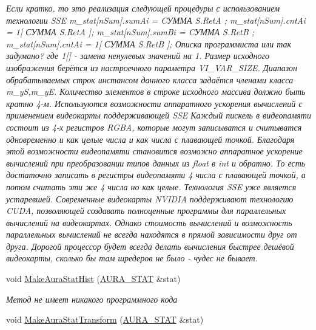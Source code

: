 \begin{DoxyCompactItemize}
\begin{DoxyCompactList}\small\item\em Если кратко, то это реализация следующей процедуры с использованием технологии S\+S\+E m\+\_\+stat\mbox{[}n\+Sum\mbox{]}.sum\+Ai = CУММА S.\+Ret\+A ; m\+\_\+stat\mbox{[}n\+Sum\mbox{]}.cnt\+Ai = 1\mbox{[} СУММА S.\+Ret\+A \mbox{]}; m\+\_\+stat\mbox{[}n\+Sum\mbox{]}.sum\+Bi = CУММА S.\+Ret\+B ; m\+\_\+stat\mbox{[}n\+Sum\mbox{]}.cnt\+Ai = 1\mbox{[} СУММА S.\+Ret\+B \mbox{]}; Описка программиста или так задумано? где 1\mbox{[}\mbox{]} -\/ замена ненулевых значений на 1. Размер исходного изображения берётся из настроечного параметра V\+I\+\_\+\+V\+A\+R\+\_\+\+S\+I\+Z\+E. Диапазон обрабатываемых строк инстансом данного класса задаётся членами класса m\+\_\+y\+S,m\+\_\+y\+E. Количество элементов в строке исходного массива должно быть кратно 4-\/м. Используются возможности аппаратного ускорения вычислений с применением видеокарты поддерживающей S\+S\+E Каждый пискель в видеопамяти состоит из 4-\/х регистров R\+G\+B\+A, которые могут записыватся и считыватся одновременно и как целые числа и как числа с плавающей точкой. Благодаря этой возможности видеопамяти становится возможно аппаратное ускорение вычислений при преобразовании типов данных из float в int и обратно. То есть достаточно записать в регистры видеопамяти 4 числа с плавающей точкой, а потом считать эти же 4 числа но как целые. Технология S\+S\+E уже является устаревшей. Современные видеокарты N\+V\+I\+D\+I\+A поддерживают технологию C\+U\+D\+A, позволяющей создавать полноценные программы для параллельных вычислений на видеокартах. Однако стоимость вычислений и возможность параллельных вычислений не всегда находятся в прямой зависимости друг от друга. Дорогой процессор будет всегда делать вычисления быстрее дешёвой видеокарты, сколько бы там шредеров не было -\/ чудес не бывает. \end{DoxyCompactList}\item 
void \hyperlink{class_c_v_i_engine_thread_ac5a7ba8ea2d72478af174b471d73fd5c}{Make\+Aura\+Stat\+Hist} (\hyperlink{class_a_u_r_a___s_t_a_t}{A\+U\+R\+A\+\_\+\+S\+T\+A\+T} \&stat)
\begin{DoxyCompactList}\small\item\em Метод не имеет никакого программного кода \end{DoxyCompactList}\item 
void \hyperlink{class_c_v_i_engine_thread_a83784b07cdfcd4f006fbfa41aacd4d86}{Make\+Aura\+Stat\+Transform} (\hyperlink{class_a_u_r_a___s_t_a_t}{A\+U\+R\+A\+\_\+\+S\+T\+A\+T} \&stat)

\end{DoxyCompactItemize}

